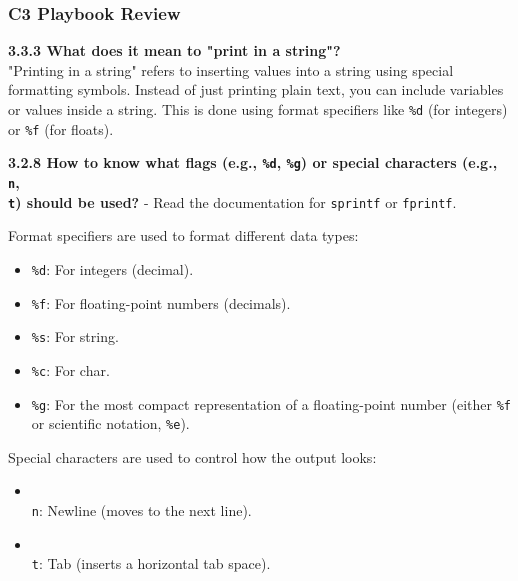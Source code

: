 \documentclass[
	11pt, %
]{beamer}
\begin{document}

\begin{frame}
    \frametitle{C3 Playbook Review}
    
    \textbf{3.3.3 What does it mean to "print in a string"?} \\
    "Printing in a string" refers to inserting values into a string using special formatting symbols. Instead of just printing plain text, you can include variables or values inside a string. This is done using format specifiers like \texttt{\%d} (for integers) or \texttt{\%f} (for floats).
    
    \textbf{3.2.8 How to know what flags (e.g., \texttt{\%d}, \texttt{\%g}) or special characters (e.g., \texttt{\\n}, \texttt{\\t}) should be used?}
    - Read the documentation for \texttt{sprintf} or \texttt{fprintf}.
    
    Format specifiers are used to format different data types:
    \begin{itemize}
        \item \texttt{\%d}: For integers (decimal).
        \item \texttt{\%f}: For floating-point numbers (decimals).
        \item \texttt{\%s}: For string.
        \item \texttt{\%c}: For char.
        \item \texttt{\%g}: For the most compact representation of a floating-point number (either \texttt{\%f} or scientific notation, \texttt{\%e}).
    \end{itemize}

    Special characters are used to control how the output looks:
    \begin{itemize}
        \item \texttt{\\n}: Newline (moves to the next line).
        \item \texttt{\\t}: Tab (inserts a horizontal tab space).
    \end{itemize}

\end{frame}



\end{document}
